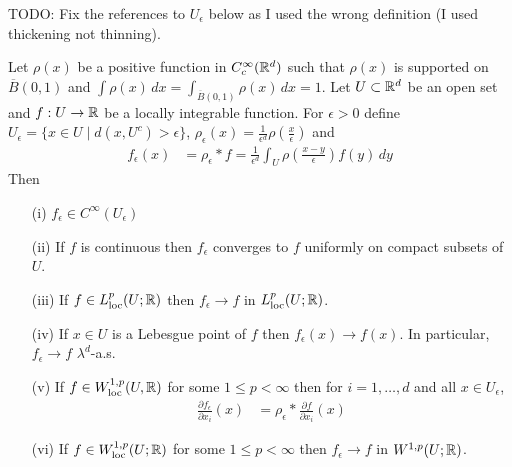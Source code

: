 TODO: Fix the references to $U_\epsilon$ below as I used the wrong definition (I used thickening not thinning).
\begin{thm}\label{ApproximationByStandardMollifier} Let $\rho(x)$ be a positive
  function in $C^\infty_c(\mathbb{R}^d)$ such
  that $\rho(x)$ is supported on $\overline{B}(0, 1)$ and $\int
  \rho(x) \, dx = \int_{\overline{B}(0, 1)}
  \rho(x) \, dx= 1$.  
Let $U \subset \mathbb{R}^d$ be an open set and $f : U \to \mathbb{R}$ be a locally integrable function.  For $\epsilon > 0$ define
$U_\epsilon = \lbrace x \in U \mid d(x, U^c) > \epsilon \rbrace$, $\rho_\epsilon(x) = \frac{1}{\epsilon^d} \rho(\frac{x}{\epsilon})$ and 
\begin{align*}
f_\epsilon(x) &= \rho_\epsilon \ast f = \frac{1}{\epsilon^d} \int_U \rho(\frac{x - y}{\epsilon}) f(y) \, dy 
\end{align*}
Then 
\begin{itemize}
\item [(i)] $f_\epsilon \in C^\infty(U_\epsilon)$
\item [(ii)] If $f$ is continuous then $f_\epsilon$ converges to $f$ uniformly on
compact subsets of $U$.  
\item [(iii)] If $f \in L^p_{\operatorname*{loc}}(U; \mathbb{R})$ then $f_\epsilon \to f$ in $L^p_{\operatorname*{loc}}(U;\mathbb{R})$.
\item [(iv)] If $x \in U$ is a Lebesgue point of $f$ then $f_\epsilon(x) \to f(x)$.  In particular, $f_\epsilon \to f$ $\lambda^d$-a.s.
\item [(v)] If $f \in W^{1,p}_{\operatorname*{loc}}(U, \mathbb{R})$ for some $1 \leq p < \infty$ then for $i = 1, \dotsc, d$ and all $x \in U_\epsilon$,
\begin{align*}
\frac{\partial f_\epsilon}{\partial x_i} (x) &= \rho_\epsilon \ast \frac{\partial f}{\partial x_i}(x)
\end{align*}
\item [(vi)] If $f \in W^{1,p}_{\operatorname*{loc}}(U; \mathbb{R})$ for some $1 \leq p < \infty$ then $f_\epsilon \to f$ in $W^{1,p}(U;\mathbb{R})$.
\end{itemize}
\end{thm}
